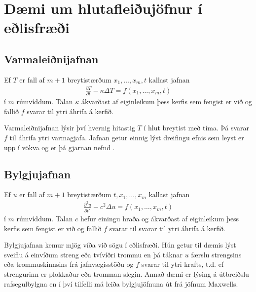 \documentclass[a4paper,10pt,icelandic]{sphinxmanual}
\begin{document}
\section{Dæmi um hlutafleiðujöfnur í eðlisfræði}
\label{\detokenize{Kafli01:daemi-um-hlutafleiujofnur-i-elisfraei}}

\subsection{Varmaleiðnijafnan}
\label{\detokenize{Kafli01:varmaleinijafnan}}
Ef \(T\) er fall af \(m+1\) breytistærðum \(x_1,\ldots,x_m,t\) kallast jafnan
\begin{equation*}
\begin{split}\frac{\partial T}{\partial t} - \kappa \Delta T = f(x_1,\ldots,x_m,t)\end{split}
\end{equation*}
 í \(m\) rúmvíddum. Talan \(\kappa\) ákvarðast af eiginleikum þess kerfis sem fengist er við og fallið \(f\) svarar til ytri áhrifa á kerfið.

Varmaleiðnijafnan lýsir því hvernig hitastig \(T\) í hlut breytist með tíma. Þá svarar \(f\) til áhrifa ytri varmagjafa. Jafnan getur einnig lýst dreifingu efnis sem leyst er upp í vökva og er þá gjarnan nefnd .


\subsection{Bylgjujafnan}
\label{\detokenize{Kafli01:bylgjujafnan}}
Ef \(u\) er fall af \(m+1\) breytistærðum \(t, x_1,\ldots,x_m\) kallast jafnan
\begin{equation*}
\begin{split}\frac{\partial^2 u}{\partial t^2} - c^2 \Delta u = f(x_1,\ldots,x_m,t)\end{split}
\end{equation*}
 í \(m\) rúmvíddum. Talan \(c\) hefur einingu hraða og ákvarðast af eiginleikum þess kerfis sem fengist er við og fallið \(f\) svarar til svarar til ytri áhrifa á kerfið.

Bylgjujafnan kemur mjög víða við sögu í eðlisfræði. Hún getur til dæmis lýst sveiflu á einvíðum streng eða tvívíðri trommu en þá táknar \(u\) færslu strengsins eða trommuskinnsins frá jafnvægisstöðu og \(f\) svarar til ytri krafts, t.d. ef strengurinn er plokkaður eða tromman slegin. Annað dæmi er lýsing á útbreiðslu rafsegulbylgna en í því tilfelli má leiða bylgjujöfnuna út frá jöfnum Maxwells.
\end{document}
